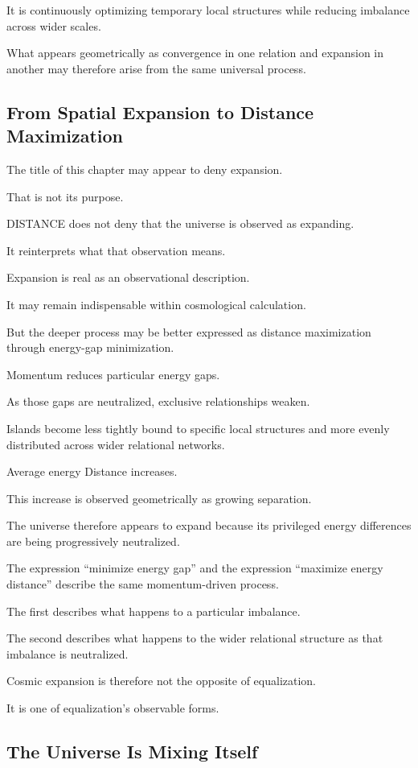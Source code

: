 It is continuously optimizing temporary local structures while reducing imbalance across wider scales.

What appears geometrically as convergence in one relation and expansion in another may therefore arise from the same universal process.

\subsection*{\textbf{From Spatial Expansion to Distance Maximization}}

The title of this chapter may appear to deny expansion.

That is not its purpose.

DISTANCE does not deny that the universe is observed as expanding.

It reinterprets what that observation means.

Expansion is real as an observational description.

It may remain indispensable within cosmological calculation.

But the deeper process may be better expressed as distance maximization through energy-gap minimization.

Momentum reduces particular energy gaps.

As those gaps are neutralized, exclusive relationships weaken.

Islands become less tightly bound to specific local structures and more evenly distributed across wider relational networks.

Average energy Distance increases.

This increase is observed geometrically as growing separation.

The universe therefore appears to expand because its privileged energy differences are being progressively neutralized.

The expression “minimize energy gap” and the expression “maximize energy distance” describe the same momentum-driven process.

The first describes what happens to a particular imbalance.

The second describes what happens to the wider relational structure as that imbalance is neutralized.

Cosmic expansion is therefore not the opposite of equalization.

It is one of equalization’s observable forms.

\subsection*{\textbf{The Universe Is Mixing Itself}}

